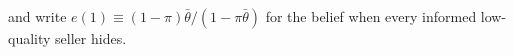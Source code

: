 and write $e(1)\equiv(1-\pi)\bar\theta/(1-\pi\bar\theta)$ for the belief when every informed low-quality seller hides.
